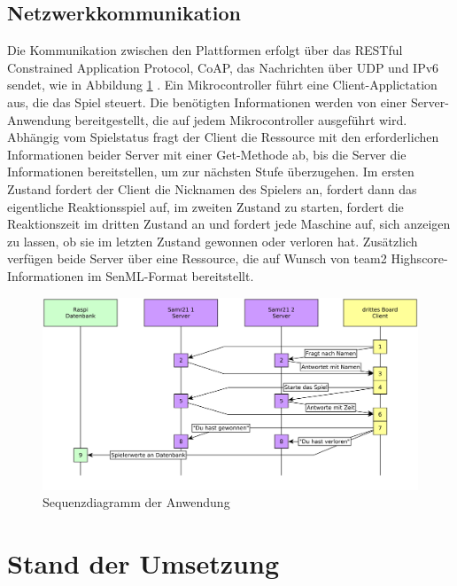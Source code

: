 \documentclass[a4paper]{article}
\begin{document}
  \subsection{Netzwerkkommunikation}
    \label{sec:net}
    Die Kommunikation zwischen den Plattformen erfolgt über das RESTful Constrained
    Application Protocol, CoAP, das Nachrichten über UDP und IPv6 sendet, wie in
    Abbildung \ref{fig:seq_diagram} . Ein Mikrocontroller führt eine
    Client-Applictation aus, die das Spiel steuert. Die benötigten Informationen
    werden von einer Server-Anwendung bereitgestellt, die auf jedem Mikrocontroller
    ausgeführt wird. Abhängig vom Spielstatus fragt der Client die Ressource mit
    den erforderlichen Informationen beider Server mit einer Get-Methode ab, bis
    die Server die Informationen bereitstellen, um zur nächsten Stufe überzugehen.
    Im ersten Zustand fordert der Client die Nicknamen des Spielers an, fordert
    dann das eigentliche Reaktionsspiel auf, im zweiten Zustand zu starten, fordert
    die Reaktionszeit im dritten Zustand an und fordert jede Maschine auf, sich
    anzeigen zu lassen, ob sie im letzten Zustand gewonnen oder verloren hat.
    Zusätzlich verfügen beide Server über eine Ressource, die auf Wunsch von team2
    Highscore-Informationen im SenML-Format bereitstellt.
    \begin{figure}[h]
      \centering
      \includegraphics[scale=0.1]{team1_kommunikation.png}
      \caption{\label{fig:seq_diagram}Sequenzdiagramm der Anwendung}
    \end{figure}

\section{Stand der Umsetzung}
  \label{sec:status}
\end{document}
